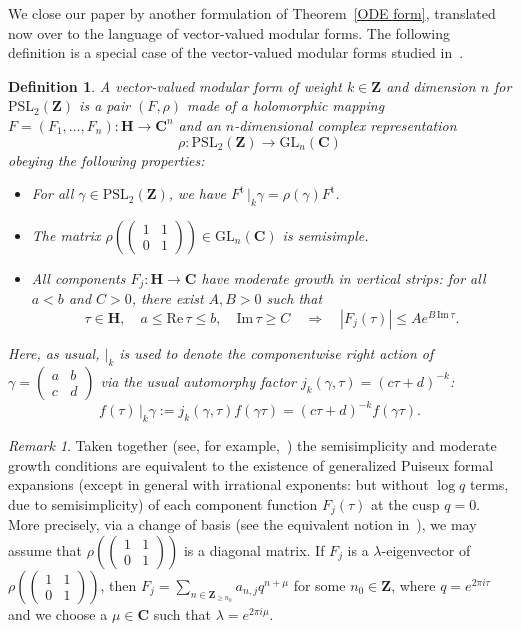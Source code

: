 \documentclass[10pt]{amsart}
\def\PSL{\mathrm{PSL}}
\def\SSS{\S}
\def\Z{\mathbf{Z}}
\def\GL{\mathrm{GL}}
\newtheorem{df}[subsubsection]{Definition}
\theoremstyle{remark}
\newtheorem{remark}[subsubsection]{Remark}
\numberwithin{equation}{subsection}
\def\C{\mathbf{C}}
\def\H{\mathbf{H}}
\begin{document}
We close our paper by  another formulation of Theorem~\ref{ODE form}, translated now over to the language of vector-valued modular forms.  The following definition is a special case of the vector-valued modular forms studied in~\cite[\SSS~2]{FrancMasonVvmf}.

\begin{df} \label{df vvmf}
A \emph{vector-valued modular form} of weight $k \in \Z$ and dimension $n$ for $\PSL_2(\Z)$ is  a pair $(F,\rho)$ made of a holomorphic mapping $F = (F_1, \ldots, F_n) : \H \to \C^n$ and an $n$-dimensional
complex representation
$$
\rho : \PSL_2(\Z) \to \GL_n(\C)
$$ 
obeying the following properties:
\begin{itemize}
\item  For all $\gamma \in \PSL_2(\Z)$, we have 
$
F^{\mathrm{t}} \,|_k \gamma = \rho(\gamma) F^\mathrm{t}
$.
\item The matrix
$\rho \left( \begin{pmatrix}  1 & 1 \\ 0 & 1 \end{pmatrix}  \right)  \in \GL_n(\C)$
is semisimple.
\item All components $F_j : \H \to \C$ have \emph{moderate growth in vertical strips}: for all $a < b$ and $C > 0$, 
there exist $A,B > 0$ such that
$$
 \tau \in \H, \quad a \leq \mathrm{Re} \, \tau \leq b, \quad  \mathrm{Im}\, \tau \geq C
\quad \Longrightarrow \quad |F_j(\tau)| \leq A e^{B \, \mathrm{Im} \, \tau}. 
$$
\end{itemize}
Here, as usual, $|_k$ is used to denote the componentwise right action of $\gamma = \begin{pmatrix} a & b \\ c & d \end{pmatrix}$ 
via the usual automorphy factor $j_k(\gamma, \tau) = (c\tau + d)^{-k}$:
$$
f(\tau) \, |_k \gamma := j_k(\gamma, \tau)  f(\gamma\tau) = (c\tau+d)^{-k} f(\gamma \tau).
$$
\end{df}


\begin{remark} \label{expansion form of the regular singularities condition}
Taken together (see, for example,~\cite[\SSS~2.A]{AndersonMoore}) the semisimplicity and moderate growth  conditions are equivalent to the existence of generalized Puiseux formal expansions (except in general with irrational exponents: but without $\log{q}$ terms, due to semisimplicity) of each component function $F_j(\tau)$ at the cusp $q = 0$.  More precisely, via a change of basis (see the equivalent notion in~\cite{FrancMasonVvmf}), we may assume that $\rho  \left( \begin{pmatrix}  1 & 1 \\ 0 & 1 \end{pmatrix} \right) $ is a diagonal matrix. If $F_j$ is a $\lambda$-eigenvector of $\rho \left( \begin{pmatrix}  1 & 1 \\ 0 & 1 \end{pmatrix} \right)$, then $F_j=\sum_{n\in \Z_{\geq n_0}} a_{n,j}q^{n+\mu}$ for some $n_0\in \Z$, where $q=e^{2 \pi i \tau}$ and we choose a $\mu\in \C$ such that $\lambda=e^{2 \pi i \mu}$.
\end{remark}
\end{document}
